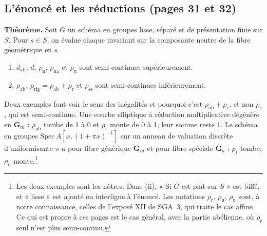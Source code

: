 \documentclass[11pt,a4paper]{article}
\begin{document}
\subsection*{L'énoncé et les réductions (pages 31 et 32)}

\textbf{Théorème.} Soit $G$ un schéma en groupes lisse, séparé et de
présentation finie sur $S$. Pour $s \in S$, on évalue chaque invariant sur la
composante neutre de la fibre géométrique en $s$.
\begin{enumerate}
\item[(i)] $d_{\mathrm{aff}}$, $d$, $\rho_{\mathrm{n}}$, $\rho_{\mathrm{na}}$ et
$\rho_{\mathrm{u}}$ sont semi-continues supérieurement.
\item[(ii)] $\rho_{\mathrm{ab}}$, $\rho_{\mathrm{rig}} = \rho_{\mathrm{ab}} +
\rho_{\mathrm{r}}$ et $\rho_{\mathrm{ss}}$ sont semi-continues
inférieurement.
\end{enumerate}

Deux exemples font voir le sens des inégalités et pourquoi c'est
$\rho_{\mathrm{ab}} + \rho_{\mathrm{r}}$, et non $\rho_{\mathrm{r}}$, qui est
semi-continue. Une courbe elliptique à réduction multiplicative dégénère en
$\mathbf{G}_{m}$ : $\rho_{\mathrm{ab}}$ tombe de 1 à 0 et $\rho_{\mathrm{r}}$
monte de 0 à 1, leur somme reste 1. Le schéma en groupes
$\mathrm{Spec}\, A[x, (1 + \pi x)^{-1}]$ sur un anneau de valuation discrète
d'uniformisante $\pi$ a pour fibre générique $\mathbf{G}_{m}$ et pour fibre
spéciale $\mathbf{G}_{a}$ : $\rho_{\mathrm{r}}$ tombe, $\rho_{\mathrm{u}}$
monte.\footnote{Les deux exemples sont les nôtres. Dans (ii), « Si $G$ est
plat sur $S$ » est biffé, et « lisse » est ajouté en interligne à l'énoncé.
Les notations $\rho_{\mathrm{r}}$, $\rho_{\mathrm{u}}$, $\rho_{\mathrm{n}}$
sont, à notre connaissance, celles de l'exposé XII de SGA~3, qui traite le cas
affine. Ce qui est propre à ces pages est le cas général, avec la partie
abélienne, où $\rho_{\mathrm{r}}$ seul n'est plus semi-continu.}
\end{document}
